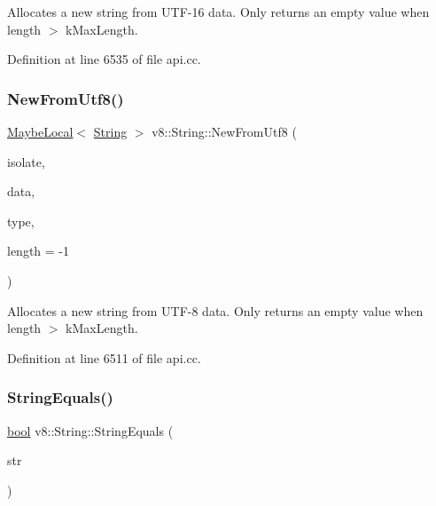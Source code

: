 Allocates a new string from U\+T\+F-\/16 data. Only returns an empty value when length $>$ k\+Max\+Length. 

Definition at line 6535 of file api.\+cc.

\mbox{\label{classv8_1_1String_a745e88987f6d7e01cb82e12ab9fc8703}} 
\subsubsection{\texorpdfstring{New\+From\+Utf8()}{NewFromUtf8()}}
{\footnotesize\ttfamily \mbox{\hyperlink{classv8_1_1MaybeLocal}{Maybe\+Local}}$<$ \mbox{\hyperlink{classv8_1_1String}{String}} $>$ v8\+::\+String\+::\+New\+From\+Utf8 (\begin{DoxyParamCaption}\item[{Isolate $\ast$}]{isolate,  }\item[{const \mbox{\hyperlink{classchar}{char}} $\ast$}]{data,  }\item[{\mbox{\hyperlink{namespacev8_ac9163ab12fb3b2a95907a3a0367c6095}{v8\+::\+New\+String\+Type}}}]{type,  }\item[{\mbox{\hyperlink{classint}{int}}}]{length = {\ttfamily -\/1} }\end{DoxyParamCaption})\hspace{0.3cm}{\ttfamily [static]}}

Allocates a new string from U\+T\+F-\/8 data. Only returns an empty value when length $>$ k\+Max\+Length. 

Definition at line 6511 of file api.\+cc.

\mbox{\label{classv8_1_1String_aaca2109ba1c2c50e45d40d7b79edb01c}} 
\subsubsection{\texorpdfstring{String\+Equals()}{StringEquals()}}
{\footnotesize\ttfamily \mbox{\hyperlink{classbool}{bool}} v8\+::\+String\+::\+String\+Equals (\begin{DoxyParamCaption}\item[{\mbox{\hyperlink{classv8_1_1Local}{Local}}$<$ \mbox{\hyperlink{classv8_1_1String}{String}} $>$}]{str }\end{DoxyParamCaption})}

